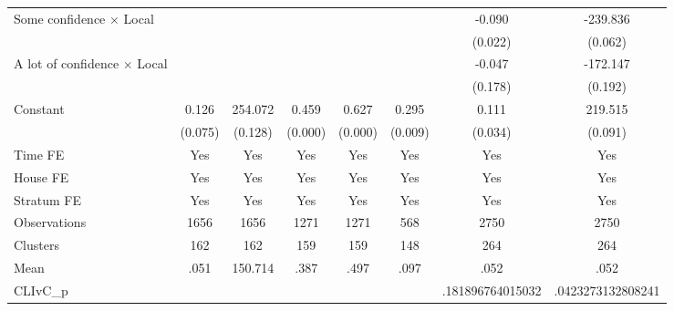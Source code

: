 {\begin{tabular}{l*{7}{c}}
Some confidence $\times$ Local&                  &                  &                  &                  &                  &   -0.090\sym{**} & -239.836\sym{*}  \\
                &                  &                  &                  &                  &                  &  (0.022)         &  (0.062)         \\
A lot of confidence $\times$ Local&                  &                  &                  &                  &                  &   -0.047         & -172.147         \\
                &                  &                  &                  &                  &                  &  (0.178)         &  (0.192)         \\
Constant        &    0.126\sym{*}  &  254.072         &    0.459\sym{***}&    0.627\sym{***}&    0.295\sym{**} &    0.111\sym{**} &  219.515\sym{*}  \\
                &  (0.075)         &  (0.128)         &  (0.000)         &  (0.000)         &  (0.009)         &  (0.034)         &  (0.091)         \\
Time FE         &      Yes         &      Yes         &      Yes         &      Yes         &      Yes         &      Yes         &      Yes         \\
House FE        &      Yes         &      Yes         &      Yes         &      Yes         &      Yes         &      Yes         &      Yes         \\
Stratum FE      &      Yes         &      Yes         &      Yes         &      Yes         &      Yes         &      Yes         &      Yes         \\
\hline
Observations    &     1656         &     1656         &     1271         &     1271         &      568         &     2750         &     2750         \\
Clusters        &      162         &      162         &      159         &      159         &      148         &      264         &      264         \\
Mean            &     .051         &  150.714         &     .387         &     .497         &     .097         &     .052         &     .052         \\
CLIvC\_p         &                  &                  &                  &                  &                  &.181896764015032         &.0423273132808241         \\
\hline\hline
\end{tabular}
}
